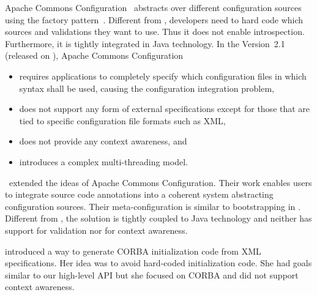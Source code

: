 Apache Commons Configuration~\cite{nosal2012supporting,online2016apache} abstracts over different configuration sources using the factory pattern~\cite{gamma1994design,denisov2013overview}.
Different from \elektra{}, developers need to hard code which sources and validations they want to use.
Thus it does not enable introspection.
Furthermore, it is tightly integrated in Java technology.
In the Version~2.1 (released on ), Apache Commons Configuration
\begin{itemize}
\item
requires applications to completely specify which configuration files in which syntax shall be used, causing the configuration integration problem,
\item
does not support any form of external specifications except for those that are tied to specific configuration file formats such as XML,
\item
does not provide any context awareness, and
\item
introduces a complex multi-threading model.
\end{itemize}

\citet{nosal2012supporting,nosal2014xml}~extended the ideas of Apache Commons Configuration.
Their work enables users to integrate source code annotations into a coherent system abstracting configuration sources.
Their meta-configuration is similar to bootstrapping in \elektra{}.
Different from \elektra{}, the solution is tightly coupled to Java technology and neither has support for validation nor for context awareness.


\citet{roll2003towards} introduced a way to generate CORBA initialization code from XML specifications.
Her idea was to avoid hard-coded initialization code.
She had goals similar to our high-level API but she focused on CORBA and did not support context awareness.

